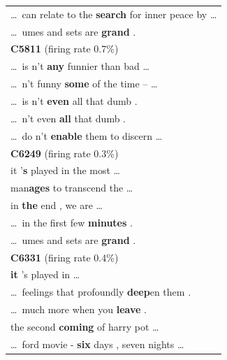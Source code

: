 \begin{longtable}{@{}>{\ttfamily}p{\linewidth}@{}}
    \dots\ can relate to the\textbf{ search} for inner peace by \dots\\
    \dots\ umes and sets are\textbf{ grand} .\\
    \addlinespace
    {\normalfont\textbf{C5811} \hfill (firing rate 0.7\%)}\\
    \cmidrule(){1-1}
    \dots\ is n't\textbf{ any} funnier than bad \dots\\
    \dots\ n't funny\textbf{ some} of the time -- \dots\\
    \dots\ is n't\textbf{ even} all that dumb .\\
    \dots\ n't even\textbf{ all} that dumb .\\
    \dots\ do n't\textbf{ enable} them to discern \dots\\
    \addlinespace
    {\normalfont\textbf{C6249} \hfill (firing rate 0.3\%)}\\
    \cmidrule(){1-1}
    it '\textbf{s} played in the most \dots\\
    man\textbf{ages} to transcend the \dots\\
    in\textbf{ the} end , we are \dots\\
    \dots\ in the first few\textbf{ minutes} .\\
    \dots\ umes and sets are\textbf{ grand} .\\
    \addlinespace
    {\normalfont\textbf{C6331} \hfill (firing rate 0.4\%)}\\
    \cmidrule(){1-1}
    \textbf{it} 's played in \dots\\
    \dots\ feelings that profoundly\textbf{ deep}en them .\\
    \dots\ much more when you\textbf{ leave} .\\
    the second\textbf{ coming} of harry pot \dots\\
    \dots\ ford movie -\textbf{ six} days , seven nights \dots\\

\end{longtable}
